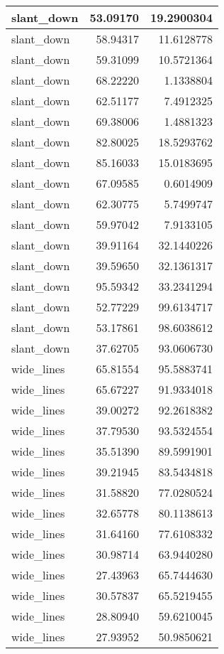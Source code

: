 \documentclass[
]{book}
\theoremstyle{definition}
\theoremstyle{definition}
\theoremstyle{definition}
\theoremstyle{definition}
\theoremstyle{remark}
\begin{document}
\begin{tabular}{l|r|r}
\hline
slant\_down & 53.09170 & 19.2900304\\
\hline
slant\_down & 58.94317 & 11.6128778\\
\hline
slant\_down & 59.31099 & 10.5721364\\
\hline
slant\_down & 68.22220 & 1.1338804\\
\hline
slant\_down & 62.51177 & 7.4912325\\
\hline
slant\_down & 69.38006 & 1.4881323\\
\hline
slant\_down & 82.80025 & 18.5293762\\
\hline
slant\_down & 85.16033 & 15.0183695\\
\hline
slant\_down & 67.09585 & 0.6014909\\
\hline
slant\_down & 62.30775 & 5.7499747\\
\hline
slant\_down & 59.97042 & 7.9133105\\
\hline
slant\_down & 39.91164 & 32.1440226\\
\hline
slant\_down & 39.59650 & 32.1361317\\
\hline
slant\_down & 95.59342 & 33.2341294\\
\hline
slant\_down & 52.77229 & 99.6134717\\
\hline
slant\_down & 53.17861 & 98.6038612\\
\hline
slant\_down & 37.62705 & 93.0606730\\
\hline
wide\_lines & 65.81554 & 95.5883741\\
\hline
wide\_lines & 65.67227 & 91.9334018\\
\hline
wide\_lines & 39.00272 & 92.2618382\\
\hline
wide\_lines & 37.79530 & 93.5324554\\
\hline
wide\_lines & 35.51390 & 89.5991901\\
\hline
wide\_lines & 39.21945 & 83.5434818\\
\hline
wide\_lines & 31.58820 & 77.0280524\\
\hline
wide\_lines & 32.65778 & 80.1138613\\
\hline
wide\_lines & 31.64160 & 77.6108332\\
\hline
wide\_lines & 30.98714 & 63.9440280\\
\hline
wide\_lines & 27.43963 & 65.7444630\\
\hline
wide\_lines & 30.57837 & 65.5219455\\
\hline
wide\_lines & 28.80940 & 59.6210045\\
\hline
wide\_lines & 27.93952 & 50.9850621\\

\end{tabular}
\end{document}
